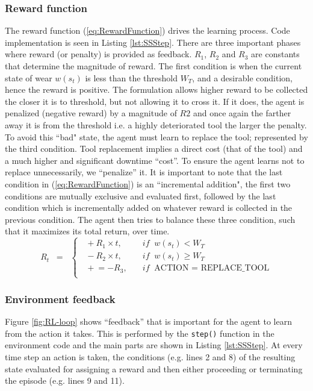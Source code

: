 \documentclass[a4paper, 12pt]{article}
\begin{document}
\subsubsection*{Reward function}
The reward function (\ref{eq:RewardFunction}) drives the learning process. Code implementation is seen in Listing \ref{lst:SSStep}. There are three important phases where reward (or penalty) is provided as feedback. $R_1$, $R_2$ and $R_3$ are constants that determine the magnitude of reward. The first condition is when the current state of wear $w(s_t)$ is less than the threshold $W_T$, and a desirable condition, hence the reward is positive. The formulation allows higher reward to be collected the closer it is to threshold, but not allowing it to cross it. If it does, the agent is penalized (negative reward) by a magnitude of $R2$ and once again the farther away it is from the threshold i.e. a highly deteriorated tool the larger the penalty. To avoid this ``bad" state, the agent must learn to replace the tool; represented by the third condition. Tool replacement implies a direct cost (that of the tool) and a much higher and significant downtime ``cost''. To ensure the agent learns not to replace unnecessarily, we ``penalize'' it. It is important to note that the last condition in (\ref{eq:RewardFunction}) is an ``incremental addition", the first two conditions are mutually exclusive and evaluated first, followed by the last condition which is incrementally added on whatever reward is collected in the previous condition. The agent then tries to balance these three condition, such that it maximizes its total return, over time.
\begin{equation}
	R_t \;\;=\;\;
	\begin{cases}
		\;\;  +R_1 \times t, & \quad if \;\; w(s_t) < W_T\\
		\;\;  -R_2 \times t, & \quad if \;\; w(s_t) \ge W_T\\
		\;\; \mathrel{+}= -R_3, & \quad if \;\; \text{ACTION = REPLACE\_TOOL}\\
	\end{cases}
	\label{eq:RewardFunction}
\end{equation}

\subsubsection*{Environment feedback}
Figure \ref{fig:RL-loop} shows ``feedback'' that is important for the agent to learn from the action it takes. This is performed by the \texttt{step()} function in the environment code and the main parts are shown in Listing \ref{lst:SSStep}. At every time step an action is taken, the conditions (e.g. lines 2 and 8) of the resulting state evaluated for assigning a reward and then either proceeding or terminating the episode (e.g. lines 9 and 11).
\end{document}
